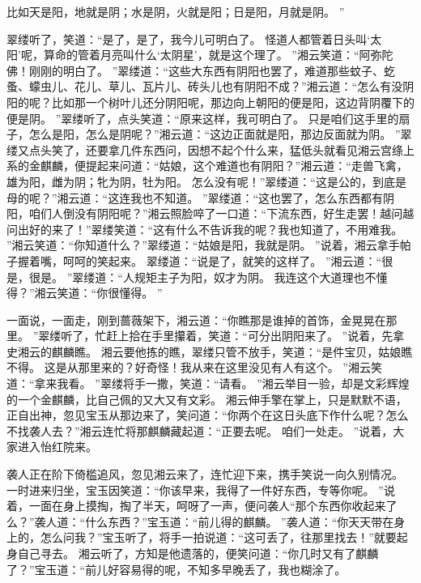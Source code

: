 比如天是阳，地就是阴；水是阴，火就是阳；日是阳，月就是阴。
”\par
翠缕听了，笑道：“是了，是了，我今儿可明白了。
怪道人都管着日头叫‘太阳’呢，算命的管着月亮叫什么‘太阴星’，就是这个理了。
”湘云笑道：“阿弥陀佛！刚刚的明白了。
”翠缕道：“这些大东西有阴阳也罢了，难道那些蚊子、虼蚤、蠓虫儿、花儿、草儿、瓦片儿、砖头儿也有阴阳不成？”湘云道：“怎么有没阴阳的呢？比如那一个树叶儿还分阴阳呢，那边向上朝阳的便是阳，这边背阴覆下的便是阴。
”翠缕听了，点头笑道：“原来这样，我可明白了。
只是咱们这手里的扇子，怎么是阳，怎么是阴呢？”湘云道：“这边正面就是阳，那边反面就为阴。
”翠缕又点头笑了，还要拿几件东西问，因想不起个什么来，猛低头就看见湘云宫绦上系的金麒麟，便提起来问道：“姑娘，这个难道也有阴阳？”湘云道：“走兽飞禽，雄为阳，雌为阴；牝为阴，牡为阳。
怎么没有呢！”翠缕道：“这是公的，到底是母的呢？”湘云道：“这连我也不知道。
”翠缕道：“这也罢了，怎么东西都有阴阳，咱们人倒没有阴阳呢？”湘云照脸啐了一口道：“下流东西，好生走罢！越问越问出好的来了！”翠缕笑道：“这有什么不告诉我的呢？我也知道了，不用难我。
”湘云笑道：“你知道什么？”翠缕道：“姑娘是阳，我就是阴。
”说着，湘云拿手帕子握着嘴，呵呵的笑起来。
翠缕道：“说是了，就笑的这样了。
”湘云道：“很是，很是。
”翠缕道：“人规矩主子为阳，奴才为阴。
我连这个大道理也不懂得？”湘云笑道：“你很懂得。
”\par
一面说，一面走，刚到蔷薇架下，湘云道：“你瞧那是谁掉的首饰，金晃晃在那里。
”翠缕听了，忙赶上拾在手里攥着，笑道：“可分出阴阳来了。
”说着，先拿史湘云的麒麟瞧。
湘云要他拣的瞧，翠缕只管不放手，笑道：“是件宝贝，姑娘瞧不得。
这是从那里来的？好奇怪！我从来在这里没见有人有这个。
”湘云笑道：“拿来我看。
”翠缕将手一撒，笑道：“请看。
”湘云举目一验，却是文彩辉煌的一个金麒麟，比自己佩的又大又有文彩。
湘云伸手擎在掌上，只是默默不语，正自出神，忽见宝玉从那边来了，笑问道：“你两个在这日头底下作什么呢？怎么不找袭人去？”湘云连忙将那麒麟藏起道：“正要去呢。
咱们一处走。
”说着，大家进入怡红院来。
\par
袭人正在阶下倚槛追风，忽见湘云来了，连忙迎下来，携手笑说一向久别情况。
一时进来归坐，宝玉因笑道：“你该早来，我得了一件好东西，专等你呢。
”说着，一面在身上摸掏，掏了半天，呵呀了一声，便问袭人“那个东西你收起来了么？”袭人道：“什么东西？”宝玉道：“前儿得的麒麟。
”袭人道：“你天天带在身上的，怎么问我？”宝玉听了，将手一拍说道：“这可丢了，往那里找去！”就要起身自己寻去。
湘云听了，方知是他遗落的，便笑问道：“你几时又有了麒麟了？”宝玉道：“前儿好容易得的呢，不知多早晚丢了，我也糊涂了。
